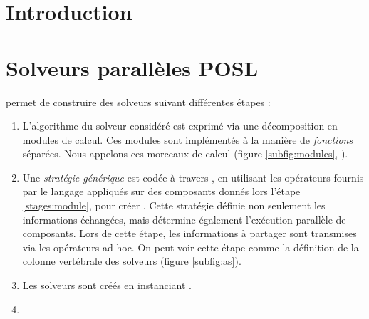 \documentclass{jfpc-preprint}
\begin{document}
\section{Introduction}


\section{Solveurs parallèles POSL}


\posl{} permet de construire des solveurs suivant différentes étapes : 
\begin{enumerate}
\item  L'algorithme du solveur considéré est  exprimé via une décomposition  en modules de calcul. Ces modules sont implémentés à la   manière de {\it fonctions} séparées. Nous appelons \INTROom{} ces morceaux de calcul (figure \ref{subfig:modules}, ).  \label{stages:module}

\item  Une {\it stratégie générique}  est codée  à travers  \posl{}, en utilisant les  opérateurs fournis par le langage appliqués  sur des  composants donnés lors l'étape \ref{stages:module}, pour créer \ass. Cette  stratégie   définie  non  seulement  les informations   échangées,  mais   détermine  également   l'exécution parallèle de  composants. Lors  de cette  étape, les  informations à partager sont  transmises via  les opérateurs  ad-hoc. On  peut voir cette étape comme la définition de la colonne vertébrale des solveurs (figure \ref{subfig:as}).

\item  Les solveurs sont créés en instanciant . %

\item {}
\end{enumerate}
\end{document}
